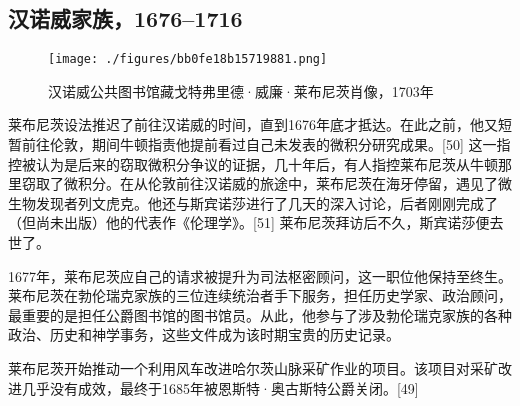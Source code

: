\subsection{汉诺威家族，1676–1716}
\begin{figure}[ht]
\centering
\texttt{[image: ./figures/bb0fe18b15719881.png]}
\caption{汉诺威公共图书馆藏戈特弗里德·威廉·莱布尼茨肖像，1703年} \label{fig_LBNC_3}
\end{figure}
莱布尼茨设法推迟了前往汉诺威的时间，直到1676年底才抵达。在此之前，他又短暂前往伦敦，期间牛顿指责他提前看过自己未发表的微积分研究成果。[50] 这一指控被认为是后来的窃取微积分争议的证据，几十年后，有人指控莱布尼茨从牛顿那里窃取了微积分。在从伦敦前往汉诺威的旅途中，莱布尼茨在海牙停留，遇见了微生物发现者列文虎克。他还与斯宾诺莎进行了几天的深入讨论，后者刚刚完成了（但尚未出版）他的代表作《伦理学》。[51] 莱布尼茨拜访后不久，斯宾诺莎便去世了。

1677年，莱布尼茨应自己的请求被提升为司法枢密顾问，这一职位他保持至终生。莱布尼茨在勃伦瑞克家族的三位连续统治者手下服务，担任历史学家、政治顾问，最重要的是担任公爵图书馆的图书馆员。从此，他参与了涉及勃伦瑞克家族的各种政治、历史和神学事务，这些文件成为该时期宝贵的历史记录。

莱布尼茨开始推动一个利用风车改进哈尔茨山脉采矿作业的项目。该项目对采矿改进几乎没有成效，最终于1685年被恩斯特·奥古斯特公爵关闭。[49]
